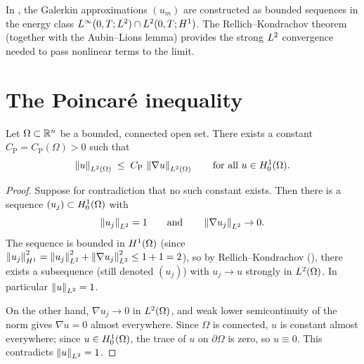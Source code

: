 \begin{remark}
  In , the Galerkin approximations $(u_{m})$ are constructed
  as bounded sequences in the energy class $L^{\infty}(0,T;L^{2}) \cap
  L^{2}(0,T;H^{1})$.  The Rellich--Kondrachov theorem (together with the Aubin--Lions
  lemma) provides the strong $L^{2}$ convergence needed to pass nonlinear terms to the
  limit.
\end{remark}

\section{The Poincar\'{e} inequality}\label{sec:poincare}

\begin{theorem}%
  \label{thm:poincare}
  Let $\Omega \subset \mathbb{R}^{n}$ be a bounded, connected open set.  There exists a
  constant $C_{\mathrm{P}} = C_{\mathrm{P}}(\Omega) > 0$ such that
  \begin{equation}\label{eq:poincare}
    \left\lVert u \right\rVert_{L^{2}(\Omega)}
    \;\le\;
    C_{\mathrm{P}}\,\left\lVert \nabla u \right\rVert_{L^{2}(\Omega)}
    \qquad \text{for all } u \in H^{1}_0(\Omega).
  \end{equation}
\end{theorem}

\begin{proof}
  Suppose for contradiction that no such constant exists.  Then there is a sequence
  $(u_{j}) \subset H^{1}_0(\Omega)$ with
  \[
    \left\lVert u_{j} \right\rVert_{L^{2}} = 1
    \qquad \text{and} \qquad
    \left\lVert \nabla u_{j} \right\rVert_{L^{2}} \to 0.
  \]
  The sequence is bounded in $H^{1}(\Omega)$ (since $\left\lVert u_{j} \right\rVert_{H^{1}}^{2} =
  \left\lVert u_{j} \right\rVert_{L^{2}}^{2} + \left\lVert \nabla u_{j} \right\rVert_{L^{2}}^{2} \le 1 + 1 = 2$), so by
  Rellich--Kondrachov (), there exists a subsequence
  (still denoted $(u_{j})$) with $u_{j} \to u$ strongly in $L^{2}(\Omega)$.
  In particular $\left\lVert u \right\rVert_{L^{2}} = 1$.

  On the other hand, $\nabla u_{j} \to 0$ in $L^{2}(\Omega)$, and weak lower
  semicontinuity of the norm gives $\nabla u = 0$ almost everywhere.
  Since $\Omega$ is connected, $u$ is constant almost everywhere; since $u \in
  H^{1}_0(\Omega)$, the trace of $u$ on $\partial\Omega$ is zero, so $u \equiv 0$.
  This contradicts $\left\lVert u \right\rVert_{L^{2}} = 1$.
\end{proof}

